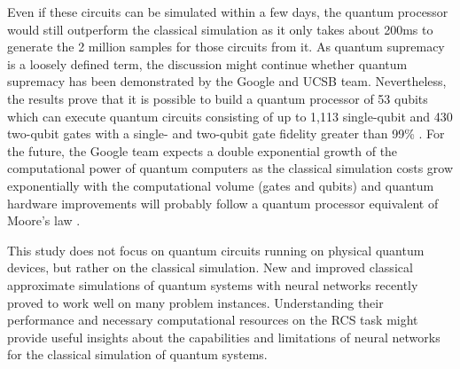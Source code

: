 Even if these circuits can be simulated within a few days, the quantum
processor would still outperform the classical simulation as it only
takes about 200ms to generate the 2 million samples for those circuits from it. As quantum
supremacy is a loosely defined term, the discussion might continue whether
quantum supremacy has been demonstrated by the Google and UCSB team. Nevertheless, 
the results prove that it is possible to build a quantum processor of 53 qubits
which can execute quantum circuits consisting of up to 1,113 single-qubit and
430 two-qubit gates with a single- and two-qubit gate fidelity greater than 99\% \cite{martines2019supremacy}.
For the future, the Google team expects a double exponential growth of the computational
power of quantum computers as the classical simulation costs grow exponentially
with the computational volume (gates and qubits) and quantum hardware
improvements will probably follow a quantum processor equivalent of Moore's law \cite{martines2019supremacy}.

This study does not focus on quantum circuits running on physical quantum devices,
but rather on the classical simulation. New and improved classical
approximate simulations of quantum systems with neural networks recently proved
to work well on many problem instances. 
Understanding their performance and necessary computational resources on
the RCS task might provide useful insights about the capabilities and
limitations of neural networks for the classical simulation of quantum systems.